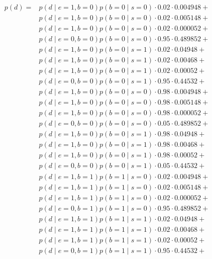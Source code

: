 \documentclass[12pt]{report}
\begin{document}
\begin{align*}    
    p(d) = 
    &p(d\mid e=1,b=0)p(b=0\mid s=0) \cdot  0.02 \cdot 0.004948 + \\
    &p(d\mid e=1,b=0)p(b=0\mid s=0) \cdot  0.02 \cdot 0.005148 + \\
    &p(d\mid e=1,b=0)p(b=0\mid s=0) \cdot  0.02 \cdot 0.000052 + \\
    &p(d\mid e=0,b=0)p(b=0\mid s=0) \cdot  0.95 \cdot 0.489852 + \\
    &p(d\mid e=1,b=0)p(b=0\mid s=1) \cdot  0.02 \cdot 0.04948  + \\
    &p(d\mid e=1,b=0)p(b=0\mid s=1) \cdot  0.02 \cdot 0.00468  + \\
    &p(d\mid e=1,b=0)p(b=0\mid s=1) \cdot  0.02 \cdot 0.00052  + \\
    &p(d\mid e=0,b=0)p(b=0\mid s=1) \cdot  0.95 \cdot 0.44532  + \\
    &p(d\mid e=1,b=0)p(b=0\mid s=0) \cdot  0.98 \cdot 0.004948 + \\
    &p(d\mid e=1,b=0)p(b=0\mid s=0) \cdot  0.98 \cdot 0.005148 + \\
    &p(d\mid e=1,b=0)p(b=0\mid s=0) \cdot  0.98 \cdot 0.000052 + \\
    &p(d\mid e=0,b=0)p(b=0\mid s=0) \cdot  0.05 \cdot 0.489852 + \\
    &p(d\mid e=1,b=0)p(b=0\mid s=1) \cdot  0.98 \cdot 0.04948  + \\
    &p(d\mid e=1,b=0)p(b=0\mid s=1) \cdot  0.98 \cdot 0.00468  + \\
    &p(d\mid e=1,b=0)p(b=0\mid s=1) \cdot  0.98 \cdot 0.00052  + \\
    &p(d\mid e=0,b=0)p(b=0\mid s=1) \cdot  0.05 \cdot 0.44532  + \\   
    &p(d\mid e=1,b=1)p(b=1\mid s=0) \cdot  0.02 \cdot 0.004948 + \\
    &p(d\mid e=1,b=1)p(b=1\mid s=0) \cdot  0.02 \cdot 0.005148 + \\
    &p(d\mid e=1,b=1)p(b=1\mid s=0) \cdot  0.02 \cdot 0.000052 + \\
    &p(d\mid e=0,b=1)p(b=1\mid s=0) \cdot  0.95 \cdot 0.489852 + \\
    &p(d\mid e=1,b=1)p(b=1\mid s=1) \cdot  0.02 \cdot 0.04948  + \\
    &p(d\mid e=1,b=1)p(b=1\mid s=1) \cdot  0.02 \cdot 0.00468  + \\
    &p(d\mid e=1,b=1)p(b=1\mid s=1) \cdot  0.02 \cdot 0.00052  + \\
    &p(d\mid e=0,b=1)p(b=1\mid s=1) \cdot  0.95 \cdot 0.44532  + \\

\end{align*}
\end{document}
